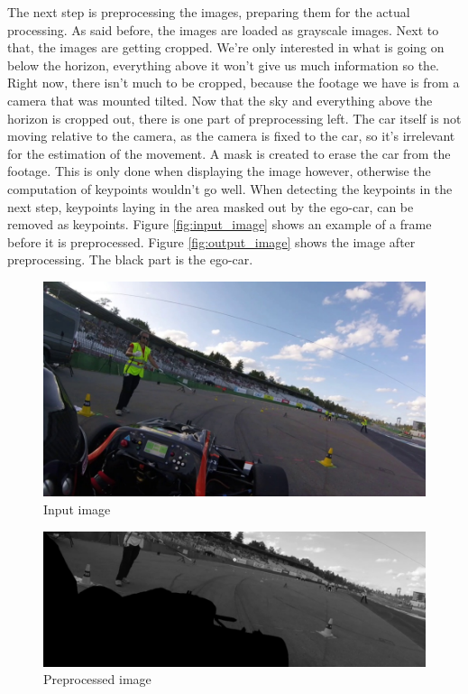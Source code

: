 The next step is preprocessing the images, preparing them for the actual processing. As said before, the images are loaded as grayscale images. Next to that, the images are getting cropped. We're only interested in what is going on below the horizon, everything above it won't give us much information so the. Right now, there isn't much to be cropped, because the footage we have is from a camera that was mounted tilted. Now that the sky and everything above the horizon is cropped out, there is one part of preprocessing left. The car itself is not moving relative to the camera, as the camera is fixed to the car, so it's irrelevant for the estimation of the movement. A mask is created to erase the car from the footage. This is only done when displaying the image however, otherwise the computation of keypoints wouldn't go well. When detecting the keypoints in the next step, keypoints laying in the area masked out by the ego-car, can be removed as keypoints. Figure \autoref{fig:input_image} shows an example of a frame before it is preprocessed. Figure \autoref{fig:output_image} shows the image after preprocessing. The black part is the ego-car.

\begin{figure}
    \centering
    \includegraphics[width=1\textwidth]{figures/input_image.jpg}
    \caption{Input image}
    \label{fig:input_image}
\end{figure}

\begin{figure}
    \centering
    \includegraphics[width=1\textwidth]{figures/output_image.jpg}
    \caption{Preprocessed image}
    \label{fig:output_image}
\end{figure}